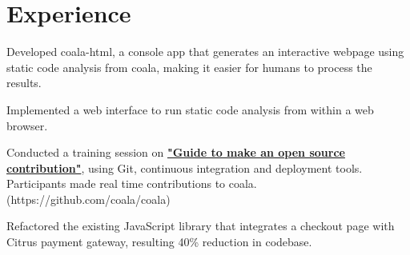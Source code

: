 \documentclass[]{deedy-resume-openfont}
\begin{document}
\hfill
\begin{minipage}[t]{0.66\textwidth} 


\section{Experience}

\vspace{\topsep} 
\begin{tightemize}
\item Developed coala-html, a console app that generates an interactive webpage using static code analysis from coala, making it easier for humans to process the results. \textbf{\href{https://github.com/coala/coala-html}{ }} \end{tightemize}
\begin{tightemize}
\item Implemented a web interface to run static code analysis from within a web browser.\end{tightemize}
\sectionsep

\vspace{\topsep} 
\begin{tightemize}
\item Conducted a training session on \textbf{\href{https://ep2016.europython.eu/conference/talks/guid-to-make-a-real-contribution-to-an-open-source-project-for-novice}{"Guide to make an open source contribution"}}, using Git, continuous integration and deployment tools. Participants made real time contributions to coala. (https://github.com/coala/coala)
\end{tightemize}
\sectionsep

\vspace{\topsep} 
\begin{tightemize}
\item Refactored the existing JavaScript library that integrates a checkout page with Citrus payment gateway, resulting 40\% reduction in codebase. \end{tightemize}
\sectionsep




\end{minipage}
\end{document}
